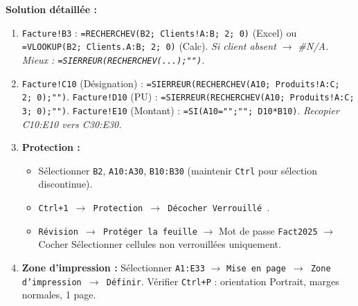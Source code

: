 \documentclass[11pt]{article}
\begin{document}
\begin{exoresolu}
\tcblower
\textbf{Solution détaillée :}
\begin{enumerate}
    \item \texttt{Facture!B3} : \texttt{=RECHERCHEV(B2; Clients!A:B; 2; 0)} (Excel) ou \texttt{=VLOOKUP(B2; Clients.A:B; 2; 0)} (Calc). \emph{Si client absent $\rightarrow$ \#N/A. Mieux : \texttt{=SIERREUR(RECHERCHEV(...);"")}.}
    \item \texttt{Facture!C10} (Désignation) : \texttt{=SIERREUR(RECHERCHEV(A10; Produits!A:C; 2; 0);"")}.
    \texttt{Facture!D10} (PU) : \texttt{=SIERREUR(RECHERCHEV(A10; Produits!A:C; 3; 0);"")}.
    \texttt{Facture!E10} (Montant) : \texttt{=SI(A10="";""; D10*B10)}. \emph{Recopier C10:E10 vers C30:E30.}
    \item \textbf{Protection :}
    \begin{itemize}
        \item Sélectionner \texttt{B2}, \texttt{A10:A30}, \texttt{B10:B30} (maintenir \texttt{Ctrl} pour sélection discontinue).
        \item \texttt{Ctrl+1 $\rightarrow$ Protection $\rightarrow$ Décocher \og Verrouillé \fg}.
        \item \texttt{Révision $\rightarrow$ Protéger la feuille} $\rightarrow$ Mot de passe \texttt{Fact2025} $\rightarrow$ Cocher \og Sélectionner cellules non verrouillées \fg uniquement.
    \end{itemize}
    \item \textbf{Zone d'impression :} Sélectionner \texttt{A1:E33} $\rightarrow$ \texttt{Mise en page $\rightarrow$ Zone d'impression $\rightarrow$ Définir}. Vérifier \texttt{Ctrl+P} : orientation Portrait, marges normales, 1 page.
\end{enumerate}
\end{exoresolu}
\end{document}
